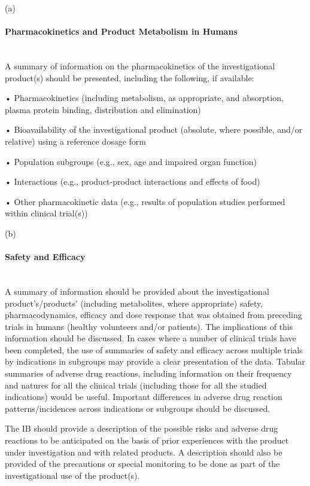 \documentclass[11pt]{article}
\begin{document}
(a)


\paragraph{Pharmacokinetics and Product Metabolism in Humans}\mbox{}\\

A summary of information on the pharmacokinetics of the investigational product(s) should be presented, including the following, if available:


• Pharmacokinetics (including metabolism, as appropriate, and absorption, plasma protein binding, distribution and elimination)


• Bioavailability of the investigational product (absolute, where possible, and/or relative) using a reference dosage form


• Population subgroups (e.g., sex, age and impaired organ function)


• Interactions (e.g., product-product interactions and effects of food)


• Other pharmacokinetic data (e.g., results of population studies performed within clinical trial(s))


(b)


\paragraph{Safety and Efficacy}\mbox{}\\

A summary of information should be provided about the investigational product's/products' (including metabolites, where appropriate) safety, pharmacodynamics, efficacy and dose response that was obtained from preceding trials in humans (healthy volunteers and/or patients). The implications of this information should be discussed. In cases where a number of clinical trials have been completed, the use of summaries of safety and efficacy across multiple trials by indications in subgroups may provide a clear presentation of the data. Tabular summaries of adverse drug reactions, including information on their frequency and natures for all the clinical trials (including those for all the studied indications) would be useful. Important differences in adverse drug reaction patterns/incidences across indications or subgroups should be discussed.


The IB should provide a description of the possible risks and adverse drug reactions to be anticipated on the basis of prior experiences with the product under investigation and with related products. A description should also be provided of the precautions or special monitoring to be done as part of the investigational use of the product(s).
\end{document}
